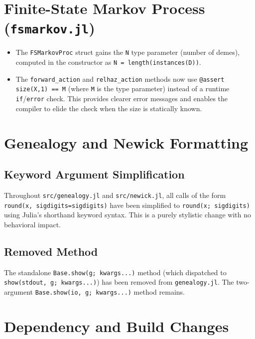 \documentclass[11pt,letterpaper]{article}
\begin{document}
\section{Finite-State Markov Process (\texttt{fsmarkov.jl})}

\begin{itemize}
  \item The \texttt{FSMarkovProc} struct gains the \texttt{N} type
        parameter (number of demes), computed in the constructor as
        \texttt{N = length(instances(D))}.
  \item The \texttt{forward\_action} and \texttt{relhaz\_action}
        methods now use \texttt{@assert size(X,1) == M} (where
        \texttt{M} is the type parameter) instead of a runtime
        \texttt{if}/\texttt{error} check. This provides clearer error
        messages and enables the compiler to elide the check when the
        size is statically known.
\end{itemize}

\section{Genealogy and Newick Formatting}

\subsection{Keyword Argument Simplification}

Throughout \texttt{src/genealogy.jl} and \texttt{src/newick.jl}, all
calls of the form \texttt{round(x, sigdigits=sigdigits)} have been
simplified to \texttt{round(x; sigdigits)} using Julia's shorthand
keyword syntax. This is a purely stylistic change with no behavioral
impact.

\subsection{Removed Method}

The standalone \texttt{Base.show(g; kwargs...)} method (which
dispatched to \texttt{show(stdout, g; kwargs...)}) has been removed
from \texttt{genealogy.jl}. The two-argument \texttt{Base.show(io, g;
kwargs...)} method remains.

\section{Dependency and Build Changes}
\end{document}
